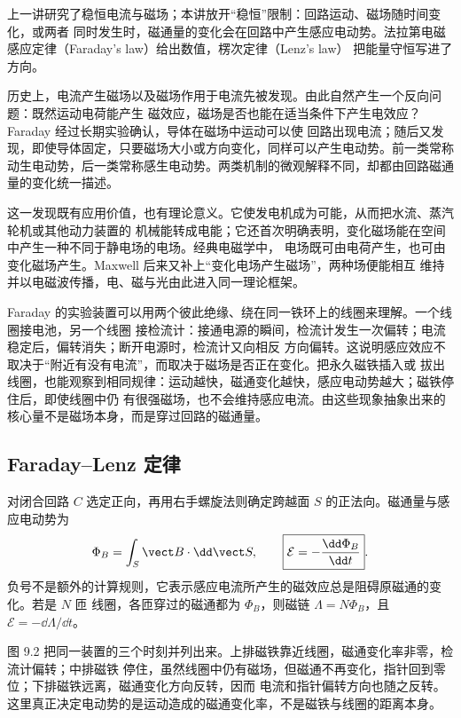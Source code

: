 上一讲研究了稳恒电流与磁场；本讲放开“稳恒”限制：回路运动、磁场随时间变化，或两者
同时发生时，磁通量的变化会在回路中产生感应电动势。法拉第电磁感应定律（Faraday's law）给出数值，楞次定律（Lenz's law）
把能量守恒写进了方向。

历史上，电流产生磁场以及磁场作用于电流先被发现。由此自然产生一个反向问题：既然运动电荷能产生
磁效应，磁场是否也能在适当条件下产生电效应？Faraday 经过长期实验确认，导体在磁场中运动可以使
回路出现电流；随后又发现，即使导体固定，只要磁场大小或方向变化，同样可以产生电动势。前一类常称
动生电动势，后一类常称感生电动势。两类机制的微观解释不同，却都由回路磁通量的变化统一描述。

这一发现既有应用价值，也有理论意义。它使发电机成为可能，从而把水流、蒸汽轮机或其他动力装置的
机械能转成电能；它还首次明确表明，变化磁场能在空间中产生一种不同于静电场的电场。经典电磁学中，
电场既可由电荷产生，也可由变化磁场产生。Maxwell 后来又补上“变化电场产生磁场”，两种场便能相互
维持并以电磁波传播，电、磁与光由此进入同一理论框架。

Faraday 的实验装置可以用两个彼此绝缘、绕在同一铁环上的线圈来理解。一个线圈接电池，另一个线圈
接检流计：接通电源的瞬间，检流计发生一次偏转；电流稳定后，偏转消失；断开电源时，检流计又向相反
方向偏转。这说明感应效应不取决于“附近有没有电流”，而取决于磁场是否正在变化。把永久磁铁插入或
拔出线圈，也能观察到相同规律：运动越快，磁通变化越快，感应电动势越大；磁铁停住后，即使线圈中仍
有很强磁场，也不会维持感应电流。由这些现象抽象出来的核心量不是磁场本身，而是穿过回路的磁通量。

\faradayHistoryContext

\subsection{Faraday--Lenz 定律}

对闭合回路 $C$ 选定正向，再用右手螺旋法则确定跨越面 $S$ 的正法向。磁通量与感应电动势为
\begin{equation}
  \Phi_B=\int_S\vect B\cdot\dd\vect S,
  \qquad
  \boxed{\mathcal E=-\frac{\dd\Phi_B}{\dd t}}.
\end{equation}
负号不是额外的计算规则，它表示感应电流所产生的磁效应总是阻碍原磁通的变化。若是 $N$ 匝
线圈，各匝穿过的磁通都为 $\Phi_B$，则磁链 $\Lambda=N\Phi_B$，且 $\mathcal E=-\dd\Lambda/\dd t$。

图 9.2 把同一装置的三个时刻并列出来。上排磁铁靠近线圈，磁通变化率非零，检流计偏转；中排磁铁
停住，虽然线圈中仍有磁场，但磁通不再变化，指针回到零位；下排磁铁远离，磁通变化方向反转，因而
电流和指针偏转方向也随之反转。这里真正决定电动势的是运动造成的磁通变化率，不是磁铁与线圈的距离本身。

